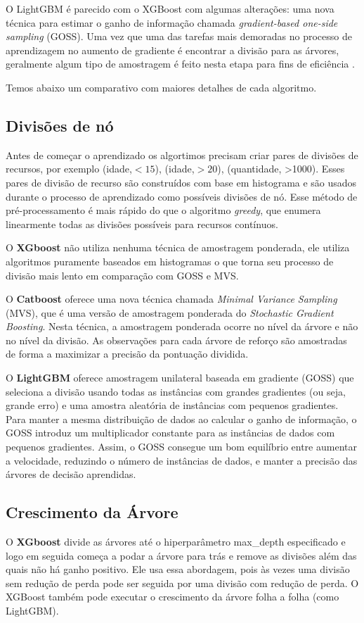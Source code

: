 O LightGBM é parecido com o XGBoost com algumas alterações: uma nova técnica para estimar o ganho de informação chamada \textit{gradient-based one-side sampling} (GOSS). Uma vez que uma das tarefas mais demoradas no processo de aprendizagem no aumento de gradiente é encontrar a divisão para as árvores, geralmente algum tipo de amostragem é feito nesta etapa para fins de eficiência \cite{article:lgbm,doc:LGBM}.

Temos abaixo um comparativo com maiores detalhes de cada algoritmo.
\subsection{Divisões de nó}
Antes de começar o aprendizado os algortimos precisam criar pares de divisões de recursos, por exemplo (idade,$<15$), (idade,$>20$), (quantidade, >1000). Esses pares de divisão de recurso são construídos com base em histograma e são usados durante o processo de aprendizado como possíveis divisões de nó. Esse método de pré-processamento é mais rápido do que o algoritmo \textit{greedy}, que enumera linearmente todas as divisões possíveis para recursos contínuos.

O \textbf{XGboost} não utiliza nenhuma técnica de amostragem ponderada, ele utiliza algoritmos puramente baseados em histogramas o que torna seu processo de divisão mais lento em comparação com GOSS e MVS.

O \textbf{Catboost} oferece uma nova técnica chamada \textit{Minimal Variance Sampling} (MVS), que é uma versão de amostragem ponderada do \textit{Stochastic Gradient Boosting}. Nesta técnica, a amostragem ponderada ocorre no nível da árvore e não no nível da divisão. As observações para cada árvore de reforço são amostradas de forma a maximizar a precisão da pontuação dividida.

O \textbf{LightGBM} oferece amostragem unilateral baseada em gradiente (GOSS) que seleciona a divisão usando todas as instâncias com grandes gradientes (ou seja, grande erro) e uma amostra aleatória de instâncias com pequenos gradientes. Para manter a mesma distribuição de dados ao calcular o ganho de informação, o GOSS introduz um multiplicador constante para as instâncias de dados com pequenos gradientes. Assim, o GOSS consegue um bom equilíbrio entre aumentar a velocidade, reduzindo o número de instâncias de dados, e manter a precisão das árvores de decisão aprendidas.

\subsection{Crescimento da Árvore}
O \textbf{XGboost} divide as árvores até o hiperparâmetro max\_depth especificado e logo em seguida começa a podar a árvore para trás e remove as divisões além das quais não há ganho positivo. Ele usa essa abordagem, pois às vezes uma divisão sem redução de perda pode ser seguida por uma divisão com redução de perda. O XGBoost também pode executar o crescimento da árvore folha a folha (como LightGBM).

